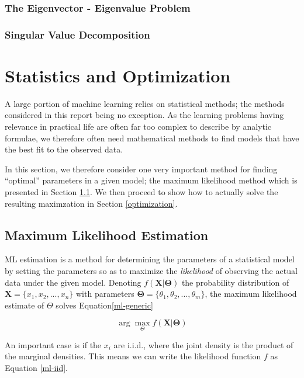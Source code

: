 \documentclass[11pt, oneside, a4paper]{report}
\begin{document}
\subsubsection{The Eigenvector - Eigenvalue Problem}

\subsubsection{Singular Value Decomposition}


\section{Statistics and Optimization}

A large portion of machine learning relies on statistical
methods; the methods considered in this report being no exception. As the learning problems having relevance in practical life are often
far too complex to describe by analytic formulae, we therefore often
need mathematical methods to find models that have the best fit to the
observed data. 

In this section, we therefore consider one very
important method for finding ``optimal'' parameters in a given model;
the maximum likelihood method which is presented in Section
\ref{ml-estimation}. We then proceed to show how to actually solve
the resulting maximzation in Section \ref{optimization}.


\subsection{Maximum Likelihood Estimation}\label{ml-estimation}

ML estimation is a method for determining the parameters of a
statistical model by setting the parameters so as to maximize the
\emph{likelihood} of observing the actual data under the given
model. Denoting $f(\boldsymbol{X}|\boldsymbol{\Theta})$ the
probability distribution of $\boldsymbol{X} = \{x_1,x_2,...,x_n\}$
with parameters $\boldsymbol{\Theta} = \{\theta_1, \theta_2, ...,
\theta_m\}$, the maximum likelihood estimate of $\Theta$ solves Equation\ref{ml-generic}

\begin{equation}
  \label{ml-generic}
  \arg \max_\Theta f(\boldsymbol{X}|\boldsymbol{\Theta})
\end{equation}

An important case is if the $x_i$ are i.i.d., where the joint density
is the product of the marginal densities. This means we can write the
likelihood function $f$ as Equation \ref{ml-iid}.
\end{document}
